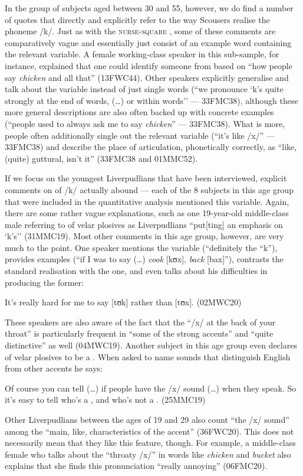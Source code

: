 In the group of subjects aged between 30 and 55, however, we do find a number of quotes that directly and explicitly refer to the way Scousers realise the phoneme /k/.
Just as with the \textsc{nurse}-\textsc{square} , some of these comments are comparatively vague and essentially just consist of an example word containing the relevant variable.
A female working-class speaker in this sub-sample, for instance, explained that one could identify someone from  based on ``how people say \emph{chicken} and all that'' (13FWC44).
Other speakers explicitly generalise and talk about the variable instead of just single words (``we pronounce `k's quite strongly at the end of words, (\ldots) or within words'' --- 33FMC38), although these more general descriptions are also often backed up with concrete examples (``people used to always ask me to say \emph{chicken}'' --- 33FMC38).
What is more, people often additionally single out the relevant variable (``it's like /x/'' --- 33FMC38) and describe the place of articulation, phonetically correctly, as ``like, (quite) guttural, isn't it'' (33FMC38 and 01MMC52).

If we focus on the youngest Liverpudlians that have been interviewed, explicit comments on  of /k/ actually abound --- each of the 8 subjects in this age group that were included in the quantitative analysis mentioned this variable.
Again, there are some rather vague explanations, such as one 19-year-old middle-class male referring to  of velar plosives as Liverpudlians ``put[ting] an emphasis on `k's'' (31MMC19).
Most other comments in this age group, however, are very much to the point.
One speaker mentions the variable (``definitely the ``k''), provides examples (``if I was to say (\ldots) \emph{cook} [kʊx], \emph{back} [bax]''), contrasts the standard realisation with the  one, and even talks about his difficulties in producing the former: 
\begin{example}
	It's really hard for me to say [tʊk] rather than [tʊx]. (02MWC20)
\end{example}

These speakers are also aware of the fact that the ``/x/ at the back of your throat'' is particularly frequent in ``some of the strong accents'' and ``quite distinctive'' as well (04MWC19).
Another subject in this age group even declares  of velar plosives to be a .
When asked to name sounds that distinguish  English from other accents he says:
\begin{example}
	Of course you can tell (\ldots) if people have the /x/ sound (\ldots) when they speak.
	So it's easy to tell who's a , and who's not a . (25MMC19)
\end{example}
Other Liverpudlians between the ages of 19 and 29 also count ``the /x/ sound'' among the ``main, like, characteristics of the accent'' (36FWC20).
This does not necessarily mean that they like this feature, though.
For example, a middle-class female who talks about the ``throaty /x/'' in words like \emph{chicken} and \emph{bucket} also explains that she finds this pronunciation ``really annoying'' (06FMC20).

